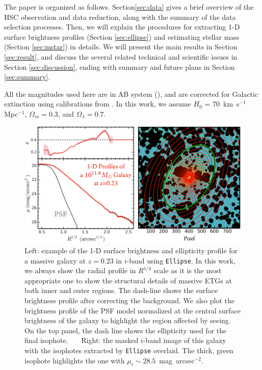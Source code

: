 \documentclass{emulateapj}
\def\sb{mag~arcsec$^{-2}$}
\begin{document}
\begin{CJK*}{UTF8}{gbsn}
    The paper is organized as follows. Section\ref{sec:data} gives a brief overview of 
    the HSC observation and data reduction, along with the summary of the data selection
    processes.  
    Then, we will explain the procedures for extracting 1-D surface brightness profiles 
    (Section \ref{sec:ellipse}) and estimating stellar mass (Section \ref{sec:mstar}) in
    details.   
    We will present the main results in Section \ref{sec:result}, and discuss the several 
    related technical and scientific issues in Section \ref{sec:discussion}, ending with
    summary and future plans in Section \ref{sec:summary}.

    All the magnitudes used here are in AB system (\citealt{Oke1983}), and are corrected 
    for Galactic extinction using calibrations from \citet{Schlafly11}.
    In this work, we assume $H_0$ = 70~km~s$^{-1}$ Mpc$^{-1}$, ${\Omega}_m=0.3$, 
    and ${\Omega}_{\lambda}=0.7$. 

    \begin{figure}[bt]
        \centering 
        \includegraphics[width=\textwidth]{fig/redbcg_ellipse_example}
        \caption{Left: example of the 1-D surface brightness and ellipticity profile 
            for a massive galaxy at $z=0.23$ in $i$-band using \texttt{Ellipse}. 
            In this work, we always show the radial profile in $R^{1/4}$ scale as it 
            is the most appropriate one to show the structural details of massive 
            ETGs at both inner and outer regions. 
            The dash-line shows the surface brightness profile after correcting the 
            background. 
            We also plot the brightness profile of the PSF model normalized at the 
            central surface brightness of the galaxy to highlight the region affected 
            by seeing. 
            On the top panel, the dash line shows the ellipticity used for the final 
            isophote.~~~ 
            Right: the masked $i$-band image of this galaxy with the isophotes extracted 
            by \texttt{Ellipse} overlaid. 
            The thick, green isophote highlights the one with $\mu_{i}\sim 28.5$~\sb.}
        \label{fig:ellipse}
    \end{figure}


\end{CJK*}
\end{document}
